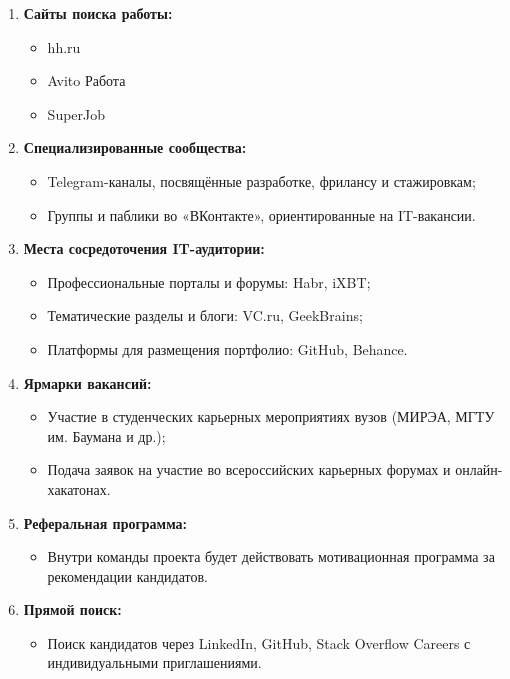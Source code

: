 \documentclass[14pt, russian]{matmex-diploma-custom}
\begin{document}
    \begin{enumerate}
        \item \textbf{Сайты поиска работы:}
        \begin{itemize}
            \item hh.ru
            \item Avito Работа
            \item SuperJob
        \end{itemize}

        \item \textbf{Специализированные сообщества:}
        \begin{itemize}
            \item Telegram-каналы, посвящённые разработке, фрилансу и стажировкам;
            \item Группы и паблики во «ВКонтакте», ориентированные на IT-вакансии.
        \end{itemize}

        \item \textbf{Места сосредоточения IT-аудитории:}
        \begin{itemize}
            \item Профессиональные порталы и форумы: Habr, iXBT;
            \item Тематические разделы и блоги: VC.ru, GeekBrains;
            \item Платформы для размещения портфолио: GitHub, Behance.
        \end{itemize}

        \item \textbf{Ярмарки вакансий:}
        \begin{itemize}
            \item Участие в студенческих карьерных мероприятиях вузов (МИРЭА, МГТУ им. Баумана и др.);
            \item Подача заявок на участие во всероссийских карьерных форумах и онлайн-хакатонах.
        \end{itemize}

        \item \textbf{Реферальная программа:}
        \begin{itemize}
            \item Внутри команды проекта будет действовать мотивационная программа за рекомендации кандидатов.
        \end{itemize}

        \item \textbf{Прямой поиск:}
        \begin{itemize}
            \item Поиск кандидатов через LinkedIn, GitHub, Stack Overflow Careers с индивидуальными приглашениями.
        \end{itemize}
    \end{enumerate}
\end{document}

